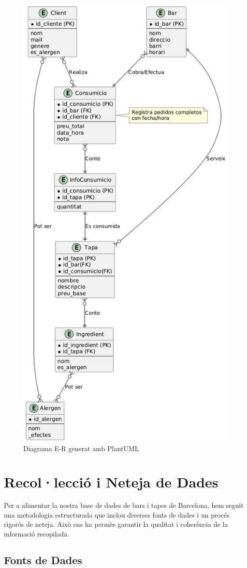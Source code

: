 \documentclass[12pt,a4paper]{article}
\begin{document}
\begin{figure}[H]
    \centering
    \includegraphics[width=0.65\linewidth]{E-R.png}
    \caption{Diagrama E-R generat amb PlantUML}
    \label{fig:plantuml-diagram}
\end{figure}


\newpage
\section{Recol·lecció i Neteja de Dades}

Per a alimentar la nostra base de dades de bars i tapes de Barcelona, hem seguit una metodologia estructurada que inclou diverses fonts de dades i un procés rigorós de neteja. Això ens ha permès garantir la qualitat i coherència de la informació recopilada.

\subsection{Fonts de Dades}
\end{document}
